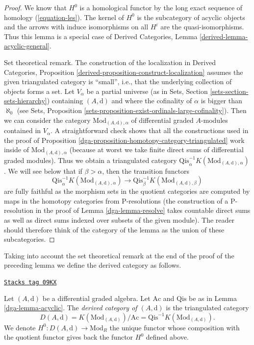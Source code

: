 \begin{proof}

We know that $H^0$ is a homological functor by the long exact
sequence of homology (\ref{equation-les}).
The kernel of $H^0$ is the subcategory of acyclic objects and
the arrows with induce isomorphisms on all $H^i$ are the
quasi-isomorphisms. Thus this lemma is a special case of
Derived Categories, Lemma \ref{derived-lemma-acyclic-general}.

\medskip\noindent
Set theoretical remark. The construction of the localization in
Derived Categories, Proposition
\ref{derived-proposition-construct-localization}
assumes the given triangulated category is ``small'', i.e., that the
underlying collection of objects forms a set. Let $V_\alpha$ be a
partial universe (as in Sets, Section \ref{sets-section-sets-hierarchy})
containing $(A, \text{d})$ and where the cofinality of $\alpha$
is bigger than $\aleph_0$
(see Sets, Proposition \ref{sets-proposition-exist-ordinals-large-cofinality}).
Then we can consider the category $\text{Mod}_{(A, \text{d}), \alpha}$
of differential graded $A$-modules contained in $V_\alpha$.
A straightforward check shows that all the constructions used in
the proof of Proposition \ref{dga-proposition-homotopy-category-triangulated}
work inside of $\text{Mod}_{(A, \text{d}), \alpha}$
(because at worst we take finite direct sums of differential graded modules).
Thus we obtain a triangulated category
$\text{Qis}_\alpha^{-1}K(\text{Mod}_{(A, \text{d}), \alpha})$.
We will see below that if $\beta > \alpha$, then the transition functors
$$
\text{Qis}_\alpha^{-1}K(\text{Mod}_{(A, \text{d}), \alpha})
\longrightarrow
\text{Qis}_\beta^{-1}K(\text{Mod}_{(A, \text{d}), \beta})
$$
are fully faithful as the morphism sets in the quotient categories
are computed by maps in the homotopy categories from P-resolutions
(the construction of a P-resolution in the proof of Lemma \ref{dga-lemma-resolve}
takes countable direct sums as well as direct sums indexed over subsets
of the given module). The reader should therefore think of the category
of the lemma as the union of these subcategories.
\end{proof}

Taking into account the set theoretical remark at the end of the
proof of the preceding lemma we define the derived category as follows.

\begin{definition}
\label{dga-definition-unbounded-derived-category}
\href{https://stacks.math.columbia.edu/tag/09KX}{\texttt{Stacks tag 09KX}}

Let $(A, \text{d})$ be a differential graded algebra.
Let $\text{Ac}$ and $\text{Qis}$ be as in Lemma \ref{dga-lemma-acyclic}.
The {\it derived category of $(A, \text{d})$} is the triangulated
category
$$
D(A, \text{d}) =
K(\text{Mod}_{(A, \text{d})})/\text{Ac} =
\text{Qis}^{-1}K(\text{Mod}_{(A, \text{d})}).
$$
We denote $H^0 : D(A, \text{d}) \to \text{Mod}_R$ the unique functor
whose composition with the quotient functor gives back the functor
$H^0$ defined above.
\end{definition}

